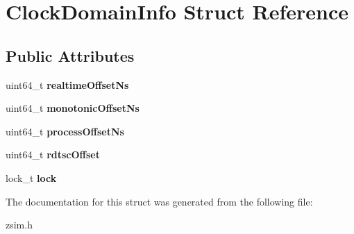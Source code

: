 \hypertarget{structClockDomainInfo}{\section{Clock\-Domain\-Info Struct Reference}
\label{structClockDomainInfo}
}
\subsection*{Public Attributes}
\begin{DoxyCompactItemize}
\item 
\hypertarget{structClockDomainInfo_a4a9add2ee0200c3bb352410d0e90bdb3}{uint64\-\_\-t {\bfseries realtime\-Offset\-Ns}}\label{structClockDomainInfo_a4a9add2ee0200c3bb352410d0e90bdb3}

\item 
\hypertarget{structClockDomainInfo_a89006057ee20c89413bfeb776adb48d6}{uint64\-\_\-t {\bfseries monotonic\-Offset\-Ns}}\label{structClockDomainInfo_a89006057ee20c89413bfeb776adb48d6}

\item 
\hypertarget{structClockDomainInfo_a79055a990e2a53a00f3b794979593e3b}{uint64\-\_\-t {\bfseries process\-Offset\-Ns}}\label{structClockDomainInfo_a79055a990e2a53a00f3b794979593e3b}

\item 
\hypertarget{structClockDomainInfo_a3dd21b35e43a89a7babcd9f038490454}{uint64\-\_\-t {\bfseries rdtsc\-Offset}}\label{structClockDomainInfo_a3dd21b35e43a89a7babcd9f038490454}

\item 
\hypertarget{structClockDomainInfo_a413f404072ec599ea0d052599cff8bd5}{lock\-\_\-t {\bfseries lock}}\label{structClockDomainInfo_a413f404072ec599ea0d052599cff8bd5}

\end{DoxyCompactItemize}


The documentation for this struct was generated from the following file\-:\begin{DoxyCompactItemize}
\item 
zsim.\-h\end{DoxyCompactItemize}
